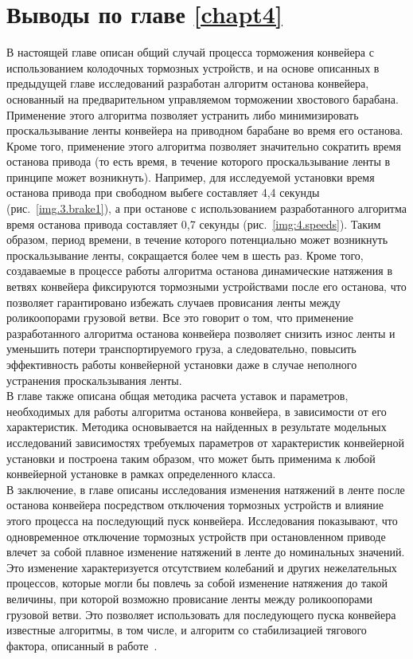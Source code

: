 \section{Выводы по главе \ref{chapt4}} \label{sect4_7}
В настоящей главе описан общий случай процесса торможения конвейера с использованием колодочных тормозных устройств, и на основе описанных в предыдущей главе исследований разработан алгоритм останова конвейера, основанный на предварительном управляемом торможении хвостового барабана. Применение этого алгоритма позволяет устранить либо минимизировать проскальзывание ленты конвейера на приводном барабане во время его останова. Кроме того, применение этого алгоритма позволяет значительно сократить время останова привода (то есть время, в течение которого проскальзывание ленты в принципе может возникнуть). Например, для исследуемой установки время останова привода при свободном выбеге составляет 4,4 секунды (рис.~\ref{img.3.brake1}), а при останове с использованием разработанного алгоритма время останова привода составляет 0,7 секунды (рис.~\ref{img:4.speeds}). Таким образом, период времени, в течение которого потенциально может возникнуть проскальзывание ленты, сокращается более чем в шесть раз. Кроме того, создаваемые в процессе работы алгоритма останова динамические натяжения в ветвях конвейера фиксируются тормозными устройствами после его останова, что позволяет гарантировано избежать случаев провисания ленты между роликоопорами грузовой ветви. Все это говорит о том, что применение разработанного алгоритма останова конвейера позволяет снизить износ ленты и уменьшить потери транспортируемого груза, а следовательно, повысить эффективность работы конвейерной установки даже в случае неполного устранения проскальзывания ленты.\\

В главе также описана общая методика расчета уставок и параметров, необходимых для работы алгоритма останова конвейера, в зависимости от его характеристик. Методика основывается на найденных в результате модельных исследований зависимостях требуемых параметров от характеристик конвейерной установки и построена таким образом, что может быть применима к любой конвейерной установке в рамках определенного класса.\\

В заключение, в главе описаны исследования изменения натяжений в ленте после останова конвейера посредством отключения тормозных устройств и влияние этого процесса на последующий пуск конвейера. Исследования показывают, что одновременное отключение тормозных устройств при остановленном приводе влечет за собой плавное изменение натяжений в ленте до номинальных значений. Это изменение характеризуется отсутствием колебаний и других нежелательных процессов, которые могли бы повлечь за собой изменение натяжения до такой величины, при которой возможно провисание ленты между роликоопорами грузовой ветви. Это позволяет использовать для последующего пуска конвейера известные алгоритмы, в том числе, и алгоритм со стабилизацией тягового фактора, описанный в работе~\cite{vdmitrieva}.

